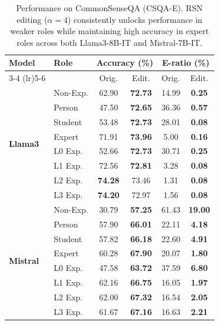 \documentclass{article}
\begin{document}
\begin{table}[htbp]
\centering
\caption{Performance on CommonSenseQA (CSQA-E). RSN editing ($\alpha=4$) consistently unlocks performance in weaker roles while maintaining high accuracy in expert roles across both Llama3-8B-IT and Mistral-7B-IT.}
\label{tab:csqa-results}
\setlength{\tabcolsep}{3pt}
\renewcommand{\arraystretch}{1.0}
\small
\begin{tabular}{l l c c c c}
\toprule
\multirow{2}{*}{\textbf{Model}} & \multirow{2}{*}{\textbf{Role}}
& \multicolumn{2}{c}{\textbf{Accuracy (\%)}} 
& \multicolumn{2}{c}{\textbf{E-ratio (\%)}} \\
\cmidrule(lr){3-4} \cmidrule(lr){5-6}
& & Orig. & Edit. & Orig. & Edit. \\
\midrule
\multirow{8}{*}{\textbf{Llama3}}& Non-Exp.   & 62.90 & \textbf{72.73} & 14.99 & \textbf{0.25} \\
& Person     & 47.50 & \textbf{72.65} & 36.36 & \textbf{0.57} \\
& Student    & 53.48 & \textbf{72.73} & 28.01 & \textbf{0.08} \\
& Expert     & 71.91 & \textbf{73.96} &  5.00 & \textbf{0.16} \\
& L0 Exp.    & 52.66 & \textbf{72.73} & 30.71 & \textbf{0.25} \\
& L1 Exp.    & 72.56 & \textbf{72.81} &  3.28 & \textbf{0.08} \\
& L2 Exp.    & \textbf{74.28} & 73.46 &  1.31 & \textbf{0.08} \\
& L3 Exp.    & \textbf{74.20} & 72.97 &  1.56 & \textbf{0.08} \\
\midrule
\multirow{8}{*}{\textbf{Mistral}}
& Non-Exp.   & 30.79 & \textbf{57.25} & 61.43 & \textbf{19.00} \\
& Person     & 57.90 & \textbf{66.01} & 22.11 & \textbf{4.18} \\
& Student    & 57.82 & \textbf{66.18} & 22.60 & \textbf{4.91} \\
& Expert     & 60.28 & \textbf{67.90} & 20.07 & \textbf{1.80} \\
& L0 Exp.    & 47.58 & \textbf{63.72} & 37.59 & \textbf{6.80} \\
& L1 Exp.    & 62.16 & \textbf{66.75} & 16.05 & \textbf{1.97} \\
& L2 Exp.    & 62.00 & \textbf{67.32} & 16.54 & \textbf{2.05} \\
& L3 Exp.    & 61.67 & \textbf{67.16} & 16.63 & \textbf{2.21} \\
\bottomrule
\end{tabular}
\end{table}
\end{document}
